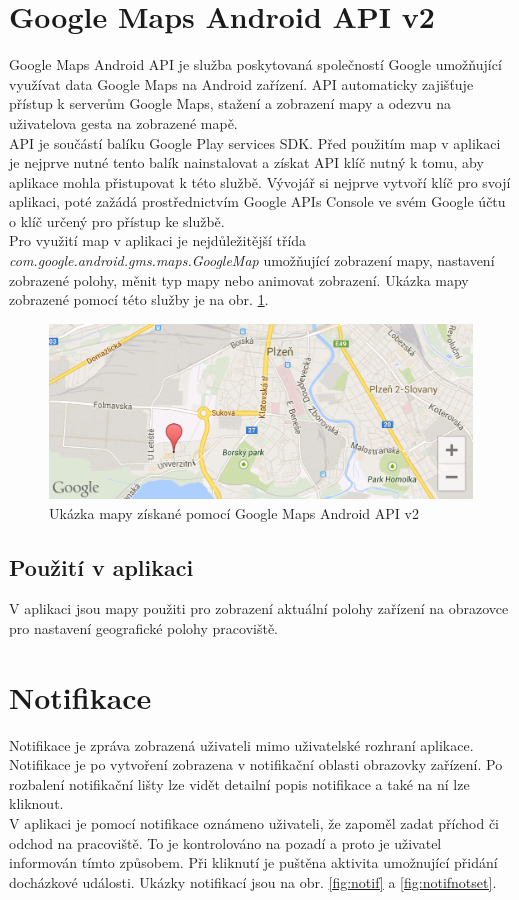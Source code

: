 \documentclass{diplomka}
\begin{document}
\section{Google Maps Android API v2}
Google Maps Android API\cite{map} je služba poskytovaná společností Google umožňující využívat data Google Maps na Android zařízení. API automaticky zajišťuje přístup k serverům Google Maps, stažení a zobrazení mapy a odezvu na uživatelova gesta na zobrazené mapě. \\ \indent
API je součástí balíku Google Play services SDK\cite{play}. Před použitím map v aplikaci je nejprve nutné tento balík nainstalovat a získat API klíč nutný k tomu, aby aplikace mohla přistupovat k této službě. Vývojář si nejprve vytvoří klíč pro svojí aplikaci, poté zažádá prostřednictvím Google APIs Console ve svém Google účtu o klíč určený pro přístup ke službě. \\ \indent
Pro využití map v aplikaci je nejdůležitější třída\\ \emph{com.google.android.gms.maps.GoogleMap} umožňující zobrazení mapy, nastavení zobrazené polohy, měnit typ mapy nebo animovat zobrazení. Ukázka mapy zobrazené pomocí této služby je na obr. \ref{fig:map}.

\begin{figure}[H]
  \centering
  \includegraphics[scale=0.43]{scr/map.png}
\caption{Ukázka mapy získané pomocí Google Maps Android API v2}
\label{fig:map}
\end{figure}

\subsection*{Použití v aplikaci}
V aplikaci jsou mapy použiti pro zobrazení aktuální polohy zařízení na obrazovce pro nastavení geografické polohy pracoviště.
\section{Notifikace}
Notifikace je zpráva zobrazená uživateli mimo uživatelské rozhraní aplikace. Notifikace je po vytvoření zobrazena v notifikační oblasti obrazovky zařízení. Po rozbalení notifikační lišty lze vidět detailní popis notifikace a také na ní lze kliknout.
\\ \indent
V aplikaci je pomocí notifikace oznámeno uživateli, že zapoměl zadat příchod či odchod na pracoviště. To je kontrolováno na pozadí a proto je uživatel informován tímto způsobem. Při kliknutí je puštěna aktivita umožnující přidání docházkové události.
Ukázky notifikací jsou na obr. \ref{fig:notif} a \ref{fig:notifnotset}.
\end{document}
